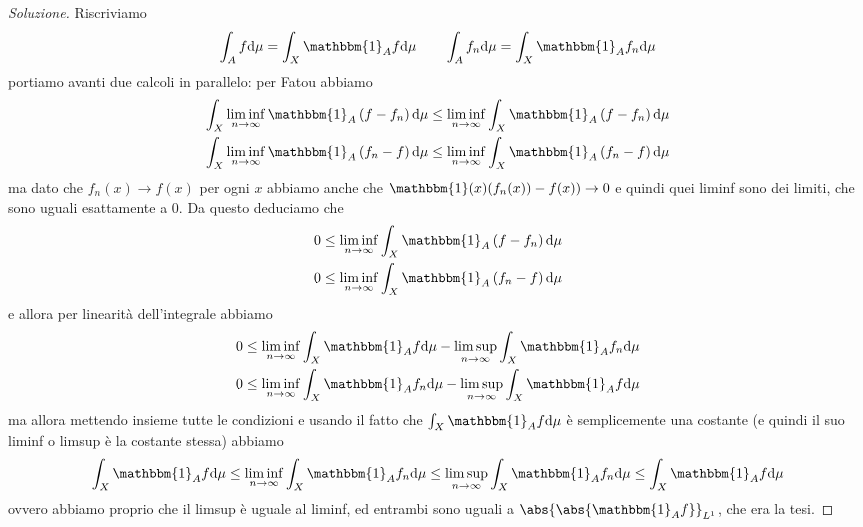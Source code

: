 \documentclass[11pt]{scrartcl}
\newcommand{\dif}{\text{d}}
\begin{document}
	\begin{proof}[Soluzione]
		Riscriviamo
		$$\int_Af\dif \mu =\int_X\mathbbm{1}_Af\dif\mu\qquad \int_Af_n\dif \mu = \int_X\mathbbm{1}_Af_n\dif\mu$$
		portiamo avanti due calcoli in parallelo: per Fatou abbiamo
		\begin{gather*}
			\int_X\liminf_{n\to\infty}\mathbbm{1}_A\left(f-f_n\right)\dif \mu\le \liminf_{n\to\infty}\int_X\mathbbm{1}_A\left(f-f_n\right)\dif \mu  \\
			\int_X\liminf_{n\to\infty}\mathbbm{1}_A\left(f_n-f\right)\dif \mu\le \liminf_{n\to\infty}\int_X\mathbbm{1}_A\left(f_n-f\right)\dif \mu 
		\end{gather*}
		ma dato che $f_n(x)\to f(x)$ per ogni $x$ abbiamo anche che $\mathbbm{1}(x)(f_n(x))-f(x))\to 0$ e quindi quei liminf sono dei limiti, che sono uguali esattamente a $0$. Da questo deduciamo che
		\begin{gather*}
			0\le \liminf_{n\to\infty}\int_X\mathbbm{1}_A\left(f-f_n\right)\dif \mu  \\
			0\le \liminf_{n\to\infty}\int_X\mathbbm{1}_A\left(f_n-f\right)\dif \mu 
		\end{gather*}
		e allora per linearità dell'integrale abbiamo
		\begin{gather*}
			0\le \liminf_{n\to\infty}\int_X\mathbbm{1}_Af\dif \mu-\limsup_{n\to\infty}\int_X\mathbbm{1}_Af_n\dif \mu  \\
			0\le \liminf_{n\to\infty}\int_X\mathbbm{1}_Af_n\dif\mu-\limsup_{n\to\infty}\int_X\mathbbm{1}_Af\dif\mu 
		\end{gather*}
		ma allora mettendo insieme tutte le condizioni e usando il fatto che $\int_X\mathbbm{1}_Af\dif \mu$ è semplicemente una costante (e quindi il suo liminf o limsup è la costante stessa) abbiamo
		$$\int_X\mathbbm{1}_Af\dif \mu \le \liminf_{n\to\infty}\int_X\mathbbm{1}_Af_n\dif\mu \le\limsup_{n\to\infty} \int_X\mathbbm{1}_Af_n\dif \mu \le \int_X\mathbbm{1}_Af\dif\mu$$
		ovvero abbiamo proprio che il limsup è uguale al liminf, ed entrambi sono uguali a $\abs{\abs{\mathbbm{1}_Af}}_{L^1}$, che era la tesi.
	\end{proof}
	
\end{document}
